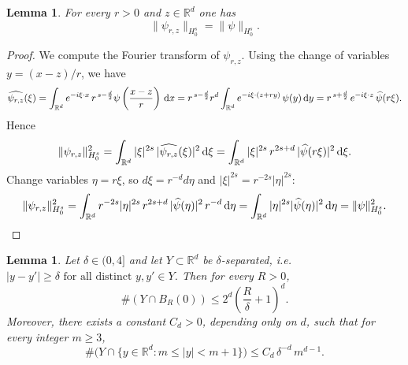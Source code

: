 \documentclass[12pt,a4paper,oneside]{amsart}
\theoremstyle{plain}
\newtheorem{lemma}[theorem]{Lemma}
\theoremstyle{definition}
\numberwithin{equation}{section}
\numberwithin{figure}{section}
\numberwithin{table}{section}
\theoremstyle{remark}
\newcommand{\R}{\mathbb{R}}
\newcommand{\dd}{\textup{d}}
\newcommand{\Fhat}[1]{\widehat{#1}}
\begin{document}
\begin{lemma}\label{l:Hdots-scaling}
For every $r>0$ and $z\in\R^d$ one has
\begin{equation*}
\|\psi_{r,z}\|_{H_0^s}=\|\psi\|_{H_0^s}.
\end{equation*}
\end{lemma}

\begin{proof}
We compute the Fourier transform of $\psi_{r,z}$.
Using the change of variables $y=(x-z)/r$, we have
\begin{equation}\label{e:fourier per riscalata}
\Fhat{\psi_{r,z}}(\xi)
=\int_{\R^d} e^{-i\xi\cdot x}\,r^{\,s-\frac d2}\psi \left(\frac{x-z}{r}\right)\,\dd x
=r^{\,s-\frac d2}r^d \int_{\R^d} e^{-i\xi\cdot(z+r y)}\,\psi(y)\,\dd y
=r^{\,s+\frac d2}\,e^{-i\xi\cdot z}\,\Fhat{\psi}(r\xi).
\end{equation}
Hence
\begin{equation*}
\|\psi_{r,z}\|_{H_0^s}^2
=\int_{\R^d} |\xi|^{2s}\,|\Fhat{\psi_{r,z}}(\xi)|^2\,\dd\xi
=\int_{\R^d} |\xi|^{2s}\,r^{2s+d}\,|\Fhat{\psi}(r\xi)|^2\,\dd\xi.
\end{equation*}
Change variables $\eta=r\xi$, so $d\xi=r^{-d}d\eta$ and $|\xi|^{2s}=r^{-2s}|\eta|^{2s}$:
\begin{equation*}
\|\psi_{r,z}\|_{H_0^s}^2
=\int_{\R^d} r^{-2s}|\eta|^{2s}\,r^{2s+d}\,|\Fhat{\psi}(\eta)|^2\,r^{-d}\,\dd\eta
=\int_{\R^d} |\eta|^{2s}|\Fhat{\psi}(\eta)|^2\,\dd\eta
=\|\psi\|_{H_0^s}^2.
\end{equation*}

\end{proof}


\begin{lemma}\label{l:conteggio}
Let $\delta\in (0,4]$ and let $Y\subset\R^d$ be $\delta$-separated, i.e. $
|y-y'|\ge \delta \text{ for all distinct }y,y'\in Y$.
Then for every $R>0$,
\begin{equation*}
\#(Y\cap B_R(0)) \le 2^d\left(\frac{R}{\delta}+1\right)^d.   \end{equation*}
Moreover, there exists a constant $C_d>0$, depending only on $d$, such that for every integer $m\geq 3$,
\begin{equation*}
\#\bigl(Y\cap\{y\in\R^d:m\le |y|<m+1\}\bigr)
\le C_d\,\delta^{-d}\,m^{d-1}.    
\end{equation*}
\end{lemma}
\end{document}
